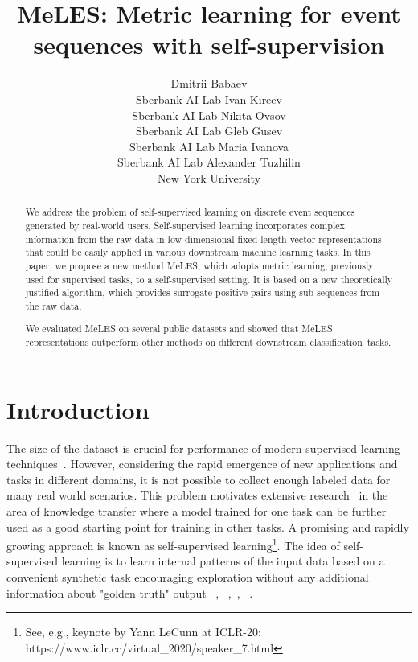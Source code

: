 \documentclass{article}
\title{MeLES: Metric learning for event sequences with self-supervision}
\author{
Dmitrii Babaev \\
Sberbank AI Lab
\And
Ivan Kireev \\
Sberbank AI Lab
\And
Nikita Ovsov \\
Sberbank AI Lab
\And
Gleb Gusev \\
Sberbank AI Lab
\And
Maria Ivanova \\
Sberbank AI Lab
\And
Alexander Tuzhilin \\
New York University
}
\begin{document}
\maketitle

\begin{abstract}

We address the problem of self-supervised learning on discrete event sequences generated by real-world users. Self-supervised learning incorporates complex information from the raw data in low-dimensional fixed-length vector representations that could be easily applied in various downstream machine learning tasks. In this paper, we propose a new method MeLES, which adopts metric learning, previously used for supervised tasks, to a self-supervised setting. It is based on a new theoretically justified algorithm, which provides surrogate positive pairs using sub-sequences from the raw data.

We evaluated MeLES on several public datasets and showed that MeLES representations outperform other methods on different downstream classification~tasks.

\end{abstract}

\section{Introduction} \label{sec-intro}

The size of the dataset is crucial for performance of modern supervised learning techniques~\cite{Sun2017RevisitingUE}. However, considering the rapid emergence of new applications and tasks in different domains, it is not possible to collect enough labeled data for many real world scenarios. This problem motivates extensive research~\cite{Tan2018ASO, Pan2010ASO} in the area of knowledge transfer where a model trained for one task can be further used as a good starting point for training in other tasks. A promising and rapidly growing approach is known as self-supervised learning\footnote{See, e.g., keynote by Yann LeCunn at ICLR-20: https://www.iclr.cc/virtual\_2020/speaker\_7.html}. The idea of self-supervised learning is to learn internal patterns of the input data based on a convenient synthetic task encouraging exploration without any additional information about "golden truth" output ~\cite{Peters2018DeepCW}, ~\cite{Devlin2019BERTPO},~\cite{Doersch2015UnsupervisedVR}, ~\cite{Oord2018RepresentationLW}. 
\end{document}
